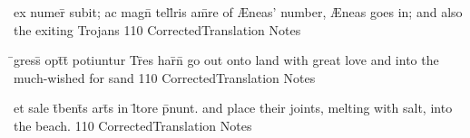 \latline
  {ex numer\={} subit; ac magn\={} tell\={}ris am\={}re}
  { of {\AE}neas' number, {\AE}neas goes in; and also the exiting Trojans }
  {110}
  { CorrectedTranslation }
  { Notes }



\latline
  {\={}gress\={\macron {\i}} opt\={}t\={} potiuntur Tr\={}es har\={}n\={}}
  { go out onto land with great love and into the much-wished for sand }
  {110}
  { CorrectedTranslation }
  { Notes }


\latline
  {et sale t\={}bent\={\macron {\i}}s art\={}s in l\={\macron {\i}}tore p\={}nunt.}
  { and place their joints, melting with salt, into the beach. }
  {110}
  { CorrectedTranslation }
  { Notes }


